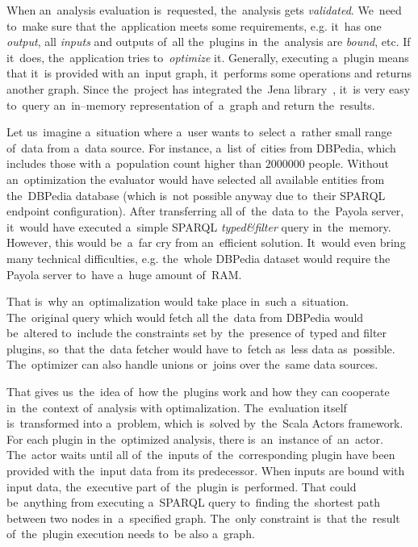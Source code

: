 When an~analysis evaluation is~requested, the~analysis gets \emph{validated}. We~need to~make
sure that the~application meets some requirements, e.g. it~has one 
\emph{output}, all \emph{inputs} and outputs of~all the~plugins in~the~analysis are \emph{bound}, etc.
If it~does, the~application tries to~\emph{optimize} it. Generally, executing a~plugin 
means that it~is provided with an~input graph, it~performs some operations and 
returns another graph. Since the~project has integrated the~Jena library~\cite{jena}, it~is 
very easy to~query an~in--memory representation of~a~graph and return the~results.

Let us~imagine a~situation where a~user wants to~select a~rather small range of~data from a~data source. For instance, a~list of~cities from DBPedia, which includes those
with a~population count higher than $2000000$ people. Without an~optimization
the evaluator would have selected all available entities from the~DBPedia 
database (which is~not possible anyway due to~their SPARQL endpoint 
configuration). After transferring all of~the~data to~the~Payola server, it~would have
executed a~simple SPARQL \emph{typed\&filter} query in~the~memory.
However, this would be~a~far cry from an~efficient solution. It~would even
bring many technical difficulties, e.g. the~whole DBPedia dataset would require 
the Payola server to~have a~huge amount of~RAM.

That is~why an~optimalization would take place in~such a~situation. The~original 
query which would fetch all the~data from DBPedia would be~altered to~include 
the constraints set by~the~presence of~typed and filter plugins, so~that the~data fetcher would have to~fetch as~less data as~possible. The~optimizer can 
also handle unions or~joins over the~same data sources.

That gives us~the~idea of~how the~plugins work and how they can cooperate in~the~context of~analysis with optimalization. The~evaluation itself is~transformed 
into a~problem, which is~solved by~the~Scala Actors framework. For each plugin 
in the~optimized analysis, there is~an~instance of~an~actor. The~actor waits 
until all of~the~inputs of~the~corresponding plugin have been provided with the~input data from its predecessor. When inputs are bound with input data, the~executive part of~the~plugin is~performed. That could be~anything from 
executing a~SPARQL query to~finding the~shortest path between two nodes in~a~specified graph. The~only constraint is~that the~result of~the~plugin execution 
needs to~be also a~graph.

